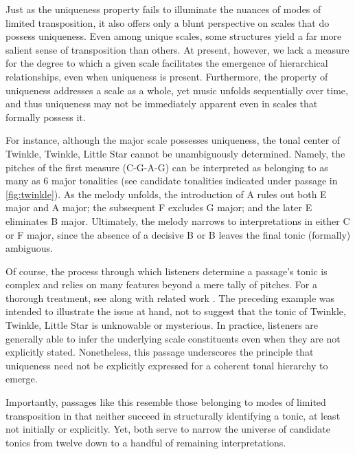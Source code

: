 \documentclass[10pt,twocolumn]{article}
\numberwithin{equation}{section} %
\begin{document}
    Just as the uniqueness property fails to illuminate the nuances of modes of limited transposition, it also offers only a blunt perspective on scales that do possess uniqueness.
    Even among unique scales, some structures yield a far more salient sense of transposition than others.
    At present, however, we lack a measure for the degree to which a given scale facilitates the emergence of hierarchical relationships, even when uniqueness is present.
    Furthermore, the property of uniqueness addresses a scale as a whole, yet music unfolds sequentially over time, and thus uniqueness may not be immediately apparent even in scales that formally possess it.

    For instance, although the major scale possesses uniqueness, the tonal center of Twinkle, Twinkle, Little Star cannot be unambiguously determined.
    Namely, the pitches of the first measure (C-G-A-G) can be interpreted as belonging to as many as 6 major tonalities (see candidate tonalities indicated under passage in \autoref{fig:twinkle}).
    As the melody unfolds, the introduction of A\text{$\natural$} rules out both E\text{$\flat$} major and A\text{$\flat$} major; the subsequent F\text{$\natural$} excludes G major; and the later E\text{$\natural$} eliminates B\text{$\flat$} major.
    Ultimately, the melody narrows to interpretations in either C or F major, since the absence of a decisive B\text{$\natural$} or B\text{$\flat$} leaves the final tonic (formally) ambiguous.

    Of course, the process through which listeners determine a passage's tonic is complex and relies on many features beyond a mere tally of pitches. For a thorough treatment, see \citet{LerdahlJackendoff1983} along with related work \citep{BharuchaKrumhansl1983,Lerdahl2004,Patel1998,Thompson1997}.
    The preceding example was intended to illustrate the issue at hand, not to suggest that the tonic of Twinkle, Twinkle, Little Star is unknowable or mysterious.
    In practice, listeners are generally able to infer the underlying scale constituents even when they are not explicitly stated.
    Nonetheless, this passage underscores the principle that uniqueness need not be explicitly expressed for a coherent tonal hierarchy to emerge.

    Importantly, passages like this resemble those belonging to modes of limited transposition in that neither succeed in structurally identifying a tonic, at least not initially or explicitly.
    Yet, both serve to narrow the universe of candidate tonics from twelve down to a handful of remaining interpretations.
\end{document}
